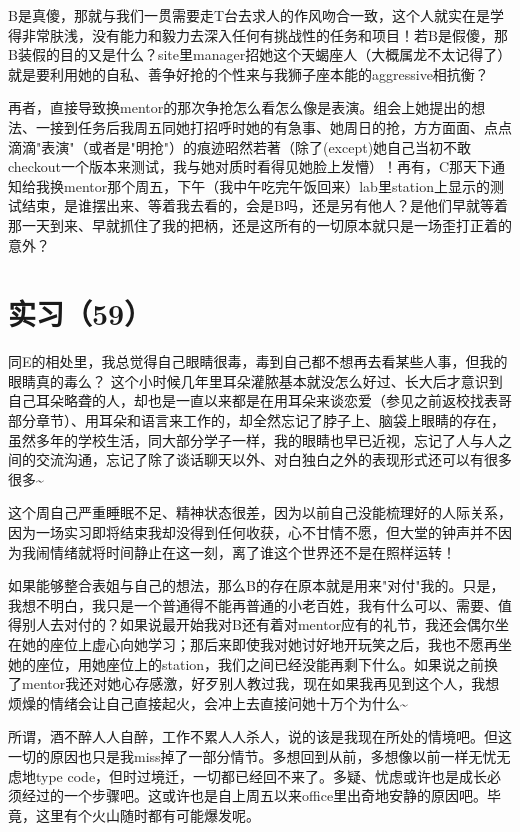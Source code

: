 \documentclass[12pt]{book}
\begin{document}
B是真傻，那就与我们一贯需要走T台去求人的作风吻合一致，这个人就实在是学得非常肤浅，没有能力和毅力去深入任何有挑战性的任务和项目！若B是假傻，那B装假的目的又是什么？site里manager招她这个天蝎座人（大概属龙不太记得了）就是要利用她的自私、善争好抢的个性来与我狮子座本能的aggressive相抗衡？

再者，直接导致换mentor的那次争抢怎么看怎么像是表演。组会上她提出的想法、一接到任务后我周五同她打招呼时她的有急事、她周日的抢，方方面面、点点滴滴"表演"（或者是"明抢"）的痕迹昭然若著（除了(except)她自己当初不敢checkout一个版本来测试，我与她对质时看得见她脸上发懵）！再有，C那天下通知给我换mentor那个周五，下午（我中午吃完午饭回来）lab里station上显示的测试结束，是谁摆出来、等着我去看的，会是B吗，还是另有他人？是他们早就等着那一天到来、早就抓住了我的把柄，还是这所有的一切原本就只是一场歪打正着的意外？


\section{实习（59）}
\label{sec-5-62}

同E的相处里，我总觉得自己眼睛很毒，毒到自己都不想再去看某些人事，但我的眼睛真的毒么？ 这个小时候几年里耳朵灌脓基本就没怎么好过、长大后才意识到自己耳朵略聋的人，却也是一直以来都是在用耳朵来谈恋爱（参见之前返校找表哥部分章节）、用耳朵和语言来工作的，却全然忘记了脖子上、脑袋上眼睛的存在，虽然多年的学校生活，同大部分学子一样，我的眼睛也早已近视，忘记了人与人之间的交流沟通，忘记了除了谈话聊天以外、对白独白之外的表现形式还可以有很多很多\textasciitilde{}~　 

这个周自己严重睡眠不足、精神状态很差，因为以前自己没能梳理好的人际关系，因为一场实习即将结束我却没得到任何收获，心不甘情不愿，但大堂的钟声并不因为我闹情绪就将时间静止在这一刻，离了谁这个世界还不是在照样运转！

如果能够整合表姐与自己的想法，那么B的存在原本就是用来"对付"我的。只是，我想不明白，我只是一个普通得不能再普通的小老百姓，我有什么可以、需要、值得别人去对付的？如果说最开始我对B还有着对mentor应有的礼节，我还会偶尔坐在她的座位上虚心向她学习；那后来即使我对她讨好地开玩笑之后，我也不愿再坐她的座位，用她座位上的station，我们之间已经没能再剩下什么。如果说之前换了mentor我还对她心存感激，好歹别人教过我，现在如果我再见到这个人，我想烦燥的情绪会让自己直接起火，会冲上去直接问她十万个为什么\textasciitilde{}~

所谓，酒不醉人人自醉，工作不累人人杀人，说的该是我现在所处的情境吧。但这一切的原因也只是我miss掉了一部分情节。多想回到从前，多想像以前一样无忧无虑地type code，但时过境迁，一切都已经回不来了。多疑、忧虑或许也是成长必须经过的一个步骤吧。这或许也是自上周五以来office里出奇地安静的原因吧。毕竟，这里有个火山随时都有可能爆发呢。　
\end{document}
